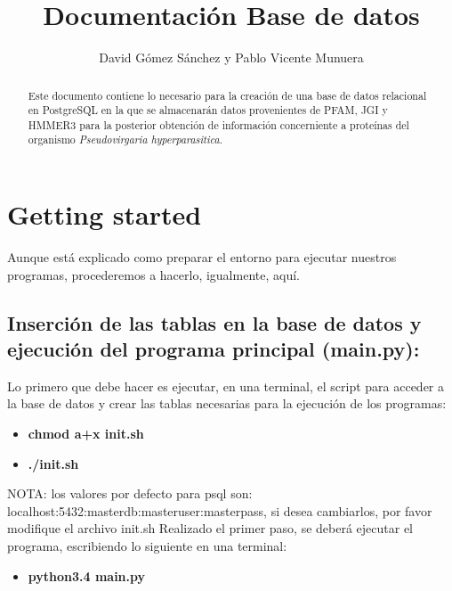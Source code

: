 \documentclass[11pt]{article} %
\title{Documentaci\'on Base de datos}
\author{David G\'omez S\'anchez y Pablo Vicente Munuera}
\date{} %
\begin{document}
\maketitle

\begin{abstract}

Este documento contiene lo necesario para la creación de una base de datos relacional en PostgreSQL en la que se almacenarán datos provenientes de PFAM, JGI y HMMER3 para la posterior obtención de información concerniente a proteínas del organismo \emph{Pseudovirgaria hyperparasitica}.

\end{abstract}

\section{Getting started}

Aunque est\'a explicado como preparar el entorno para ejecutar nuestros programas, procederemos a hacerlo, igualmente, aqu\'i.

\subsection{Inserción de las tablas en la base de datos y ejecución del programa principal (main.py):}

Lo primero que debe hacer es ejecutar, en una terminal, el script para acceder a la base de datos y crear las tablas necesarias para la ejecución de los programas:
\begin{itemize}

\item \textbf{chmod a+x init.sh}

\item \textbf{./init.sh}

\end{itemize}

NOTA: los valores por defecto para psql son: localhost:5432:masterdb:masteruser:masterpass, si desea cambiarlos, por favor modifique el archivo init.sh
Realizado el primer paso, se deberá ejecutar el programa, escribiendo lo siguiente en una terminal:

\begin{itemize}

\item \textbf{python3.4 main.py}

\end{itemize}
\end{document}
